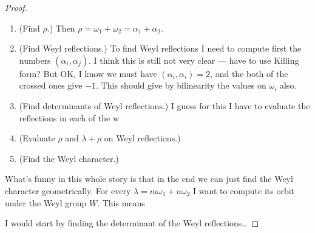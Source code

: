 \begin{proof}
\begin{enumerate}
\item (Find $\rho$.) Then
$\rho=\omega_1+\omega_2=\alpha_1+\alpha_2$.

\item (Find Weyl reflections.) To find Weyl
reflections I need to compute
first the numbers $(\alpha_i, \alpha_j)$. I
think this is still not
very clear --- have to use Killing form? But
OK, I know we must have
$(\alpha_i,\alpha_i)=2$, and the both of the
crossed ones give $-1$.
This should give by bilinearity the values on
$\omega_i$ also.

\item (Find determinants of Weyl
reflections.) I guess for this
I have to evaluate the reflections in each of
the w

\item (Evaluate $\rho$ and $\lambda+\rho$ on
Weyl reflections.)

\item (Find the Weyl character.)
\end{enumerate}

What's funny in this whole story is that
in the end we can just find the Weyl
character geometrically.
For every $\lambda=m \omega_1+n \omega_2$
I want to compute its orbit under the Weyl
group $W$.
This means


I would start by finding the determinant
of the Weyl reflections…
\end{proof}





